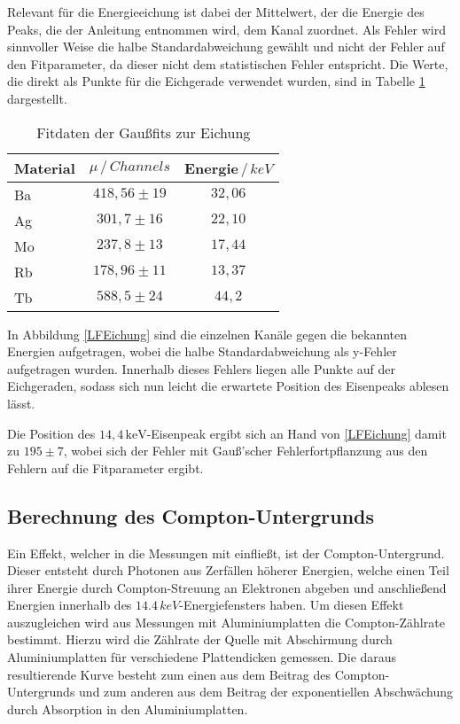 Relevant für die Energieeichung ist dabei der Mittelwert, der die Energie des Peaks, die der Anleitung entnommen wird, dem Kanal zuordnet. Als Fehler wird sinnvoller Weise die halbe Standardabweichung gewählt und nicht der Fehler auf den Fitparameter, da dieser nicht dem statistischen Fehler entspricht. Die Werte, die direkt als Punkte für die Eichgerade verwendet wurden, sind in Tabelle \ref{tab:eichung1} dargestellt. 
\begin{table}[h!]
	\centering
	\begin{tabular}{l|cc}
		Material&$\mu\,/\,\si{Channels}$&Energie$\,/\,\si{keV}$\\\hline
		Ba&$418,56\pm19$&$32,06$\\
		Ag&$301,7\pm16$&$22,10$\\
		Mo&$237,8\pm13$&$17,44$\\
		Rb&$178,96\pm11$&$13,37$\\
		Tb&$588,5\pm24$&$44,2$\\
	\end{tabular}
	\caption{Fitdaten der Gaußfits zur Eichung}
	\label{tab:eichung1}
\end{table}


In Abbildung \ref{LFEichung} sind die einzelnen Kanäle gegen die bekannten Energien aufgetragen, wobei die halbe Standardabweichung als y-Fehler aufgetragen wurden. Innerhalb dieses Fehlers liegen alle Punkte auf der Eichgeraden, sodass sich nun leicht die erwartete Position des Eisenpeaks ablesen lässt.


 Die Position des $14,4\,\mathrm{keV}$-Eisenpeak ergibt sich an Hand von \ref{LFEichung} damit zu $195\pm 7$, wobei sich der Fehler mit Gauß'scher Fehlerfortpflanzung aus den Fehlern auf die Fitparameter ergibt.


\subsection{Berechnung des Compton-Untergrunds}

Ein Effekt, welcher in die Messungen mit einfließt, ist der Compton-Untergrund. Dieser entsteht durch Photonen aus Zerfällen höherer Energien, welche einen Teil ihrer Energie durch Compton-Streuung an Elektronen abgeben und anschließend Energien innerhalb des $14.4\,\si{keV}$-Energiefensters haben. Um diesen Effekt auszugleichen wird aus Messungen mit Aluminiumplatten die Compton-Zählrate bestimmt. Hierzu wird die Zählrate der Quelle mit Abschirmung durch Aluminiumplatten für verschiedene Plattendicken gemessen. Die daraus resultierende Kurve besteht zum einen aus dem Beitrag des Compton-Untergrunds und zum anderen aus dem Beitrag der exponentiellen Abschwächung durch Absorption in den Aluminiumplatten.\\

